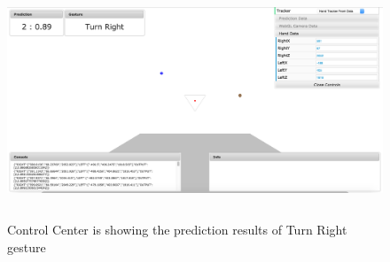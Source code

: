 \begin{figure}
	[h] \centering 
	\includegraphics[height=70mm]{figures/result/cc-turn-right.jpg} \caption{Control Center is showing the prediction results of Turn Right gesture} 
	\label{res:cc:turn:right}	
\end{figure}